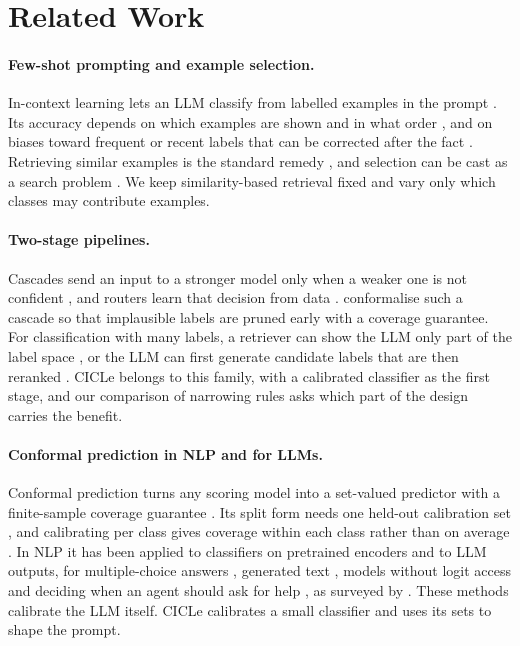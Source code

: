 \section{Related Work}
\label{sec:related}

\paragraph{Few-shot prompting and example selection.}
In-context learning lets an LLM classify from labelled examples in the prompt \citep{brown2020language}.
Its accuracy depends on which examples are shown and in what order \citep{lu2022fantastically}, and on biases toward frequent or recent labels that can be corrected after the fact \citep{zhao2021calibrate}.
Retrieving similar examples is the standard remedy \citep{liu2022makes,rubin2022learning}, and selection can be cast as a search problem \citep{purohit2025sampleefficientdemonstrationselection}.
We keep similarity-based retrieval fixed and vary only which classes may contribute examples.

\paragraph{Two-stage pipelines.}
Cascades send an input to a stronger model only when a weaker one is not confident \citep{varshney2022model,chen2024frugalgpt,yue2024cascades}, and routers learn that decision from data \citep{ding2024hybrid}.
\citet{fisch2021efficient} conformalise such a cascade so that implausible labels are pruned early with a coverage guarantee.
For classification with many labels, a retriever can show the LLM only part of the label space \citep{milios2023incontext}, or the LLM can first generate candidate labels that are then reranked \citep{zhu2024icxml,doosterlinck2024incontext}.
CICLe \citep{randl2024cicle} belongs to this family, with a calibrated classifier as the first stage, and our comparison of narrowing rules asks which part of the design carries the benefit.

\paragraph{Conformal prediction in NLP and for LLMs.}
Conformal prediction turns any scoring model into a set-valued predictor with a finite-sample coverage guarantee \citep{vovk2005algorithmic,angelopoulos2023gentle}.
Its split form needs one held-out calibration set \citep{papadopoulos2002inductive}, and calibrating per class gives coverage within each class rather than on average \citep{vovk2012conditional}.
In NLP it has been applied to classifiers on pretrained encoders \citep{maltoudoglou2020bert} and to LLM outputs, for multiple-choice answers \citep{kumar2023conformal}, generated text \citep{quach2024conformal}, models without logit access \citep{su2024api} and deciding when an agent should ask for help \citep{ren2023robots}, as surveyed by \citet{campos2024conformal}.
These methods calibrate the LLM itself. CICLe calibrates a small classifier and uses its sets to shape the prompt.


